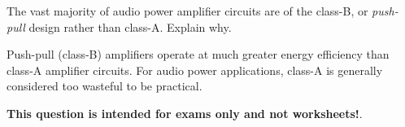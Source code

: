 

The vast majority of audio power amplifier circuits are of the class-B, or {\it push-pull} design rather than class-A.  Explain why.







Push-pull (class-B) amplifiers operate at much greater energy efficiency than class-A amplifier circuits.  For audio power applications, class-A is generally considered too wasteful to be practical.







{\bf This question is intended for exams only and not worksheets!}.




